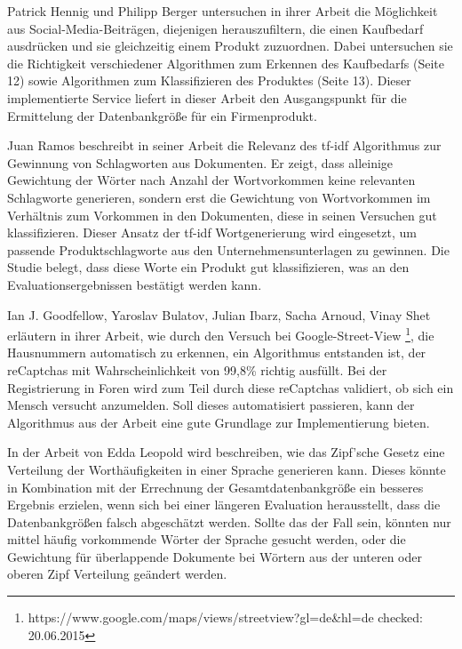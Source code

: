 Patrick Hennig und Philipp Berger \cite{n2o} untersuchen in ihrer Arbeit die Möglichkeit aus Social-Media-Beiträgen, diejenigen herauszufiltern, die einen Kaufbedarf ausdrücken und sie gleichzeitig einem Produkt zuzuordnen. Dabei untersuchen sie die Richtigkeit verschiedener Algorithmen zum Erkennen des Kaufbedarfs (Seite 12) sowie Algorithmen zum Klassifizieren des Produktes (Seite 13). Dieser implementierte Service liefert in dieser Arbeit den Ausgangspunkt für die Ermittelung der Datenbankgröße für ein Firmenprodukt.

Juan Ramos \cite{ramos2003using} beschreibt in seiner Arbeit die Relevanz des tf-idf Algorithmus zur Gewinnung von Schlagworten aus Dokumenten. Er zeigt, dass alleinige Gewichtung der Wörter nach Anzahl der Wortvorkommen keine relevanten Schlagworte generieren, sondern erst die Gewichtung von Wortvorkommen im Verhältnis zum Vorkommen in den Dokumenten, diese in seinen Versuchen gut klassifizieren. Dieser Ansatz der tf-idf Wortgenerierung wird eingesetzt, um passende Produktschlagworte aus den Unternehmensunterlagen zu gewinnen. Die Studie belegt, dass diese Worte ein Produkt gut klassifizieren, was an den Evaluationsergebnissen bestätigt werden kann.

Ian J. Goodfellow, Yaroslav Bulatov, Julian Ibarz, Sacha Arnoud, Vinay Shet \cite{goodfellow2013multi} erläutern in ihrer Arbeit, wie durch den Versuch bei Google-Street-View \footnote{https://www.google.com/maps/views/streetview?gl=de\&hl=de checked: 20.06.2015}, die Hausnummern automatisch zu erkennen, ein Algorithmus entstanden ist, der reCaptchas mit Wahrscheinlichkeit von 99,8\% richtig ausfüllt. Bei der Registrierung in Foren wird zum Teil durch diese reCaptchas validiert, ob sich ein Mensch versucht anzumelden. Soll dieses automatisiert passieren, kann der Algorithmus aus der Arbeit eine gute Grundlage zur Implementierung bieten.

In der Arbeit von Edda Leopold \cite{leopold2002zipfsche} wird beschreiben, wie das Zipf'sche Gesetz eine Verteilung der Worthäufigkeiten in einer Sprache generieren kann. Dieses könnte in Kombination mit der Errechnung der Gesamtdatenbankgröße ein besseres Ergebnis erzielen, wenn sich bei einer längeren Evaluation herausstellt, dass die Datenbankgrößen falsch abgeschätzt werden. Sollte das der Fall sein, könnten nur mittel häufig vorkommende Wörter der Sprache gesucht werden, oder die Gewichtung für überlappende Dokumente bei Wörtern aus der unteren oder oberen Zipf Verteilung geändert werden. 

